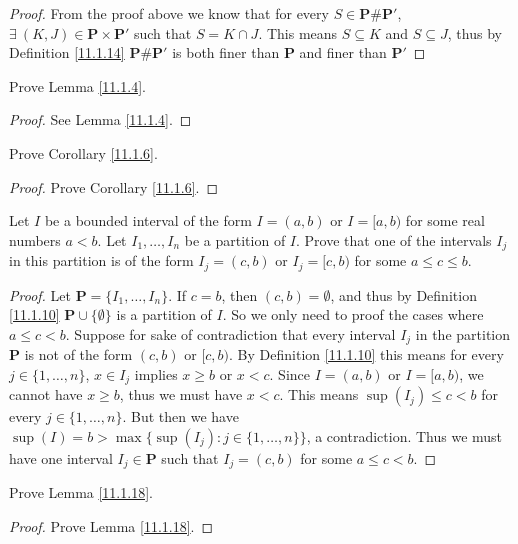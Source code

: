\begin{proof}
    From the proof above we know that for every \(S \in \mathbf{P} \# \mathbf{P}'\), \(\exists\ (K, J) \in \mathbf{P} \times \mathbf{P}'\) such that \(S = K \cap J\).
    This means \(S \subseteq K\) and \(S \subseteq J\), thus by Definition \ref{11.1.14} \(\mathbf{P} \# \mathbf{P}'\) is both finer than \(\mathbf{P}\) and finer than \(\mathbf{P}'\)
\end{proof}

\exercisesection

\begin{exercise}\label{ex 11.1.1}
    Prove Lemma \ref{11.1.4}.
\end{exercise}

\begin{proof}
    See Lemma \ref{11.1.4}.
\end{proof}

\begin{exercise}\label{ex 11.1.2}
    Prove Corollary \ref{11.1.6}.
\end{exercise}

\begin{proof}
    Prove Corollary \ref{11.1.6}.
\end{proof}

\begin{exercise}\label{ex 11.1.3}
    Let \(I\) be a bounded interval of the form \(I = (a, b)\) or \(I = [a, b)\) for some real numbers \(a < b\).
    Let \(I_1, \dots, I_n\) be a partition of \(I\).
    Prove that one of the intervals \(I_j\) in this partition is of the form \(I_j = (c, b)\) or \(I_j = [c, b)\) for some \(a \leq c \leq b\).
\end{exercise}

\begin{proof}
    Let \(\mathbf{P} = \{I_1, \dots, I_n\}\).
    If \(c = b\), then \((c, b) = \emptyset\), and thus by Definition \ref{11.1.10} \(\mathbf{P} \cup \{\emptyset\}\) is a partition of \(I\).
    So we only need to proof the cases where \(a \leq c < b\).
    Suppose for sake of contradiction that every interval \(I_j\) in the partition \(\mathbf{P}\) is not of the form \((c, b)\) or \([c, b)\).
    By Definition \ref{11.1.10} this means for every \(j \in \{1, \dots, n\}\), \(x \in I_j\) implies \(x \geq b\) or \(x < c\).
    Since \(I = (a, b)\) or \(I = [a, b)\), we cannot have \(x \geq b\), thus we must have \(x < c\).
    This means \(\sup(I_j) \leq c < b\) for every \(j \in \{1, \dots, n\}\).
    But then we have \(\sup(I) = b > \max\big\{\sup(I_j) : j \in \{1, \dots, n\}\big\}\), a contradiction.
    Thus we must have one interval \(I_j \in \mathbf{P}\) such that \(I_j = (c, b)\) for some \(a \leq c < b\).
\end{proof}

\begin{exercise}\label{ex 11.1.4}
    Prove Lemma \ref{11.1.18}.
\end{exercise}

\begin{proof}
    Prove Lemma \ref{11.1.18}.
\end{proof}
